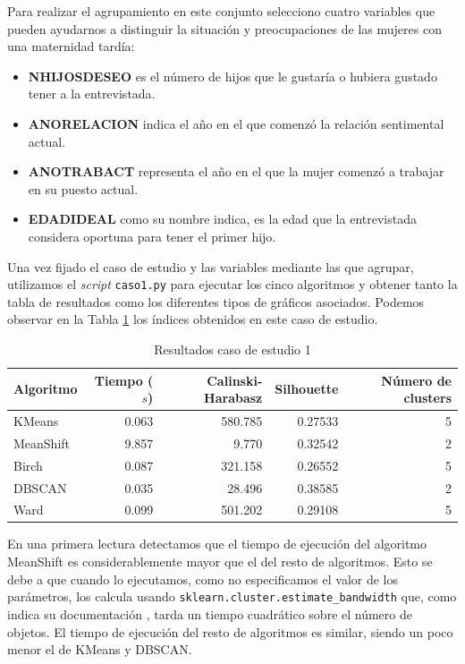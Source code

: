 \documentclass[a4paper, 20pt]{article}
\begin{document}
Para realizar el agrupamiento en este conjunto selecciono cuatro variables que pueden ayudarnos a distinguir la situación y preocupaciones de las mujeres con una maternidad tardía:
\begin{itemize}
\item \textbf{NHIJOSDESEO} es el número de hijos que le gustaría o hubiera gustado tener a la entrevistada.
\item \textbf{ANORELACION} indica el año en el que comenzó la relación sentimental actual.
\item \textbf{ANOTRABACT} representa el año en el que la mujer comenzó a trabajar en su puesto actual.
\item \textbf{EDADIDEAL} como su nombre indica, es la edad que la entrevistada considera oportuna para tener el primer hijo.
\end{itemize}

Una vez fijado el caso de estudio y las variables mediante las que agrupar, utilizamos el \textit{script} \texttt{caso1.py} para ejecutar los cinco algoritmos y obtener tanto la tabla de resultados como los diferentes tipos de gráficos asociados. Podemos observar en la Tabla \ref{tab:algorithms1} los índices obtenidos en este caso de estudio.

\begin{table}[H]
\centering
\caption{Resultados caso de estudio 1}
\label{tab:algorithms1}
\begin{tabular}{lrrrr}
\toprule
Algoritmo & Tiempo ($s$) & Calinski-Harabasz & Silhouette & Número de clusters\\
\midrule
KMeans & 0.063 & 580.785 & 0.27533 & 5 \\
MeanShift & 9.857 & 9.770 & 0.32542 & 2 \\
Birch & 0.087 & 321.158 & 0.26552 & 5 \\
DBSCAN & 0.035 & 28.496 & 0.38585 & 2 \\
Ward & 0.099 & 501.202 & 0.29108 & 5 \\
\bottomrule
\end{tabular}
\end{table}

En una primera lectura detectamos que el tiempo de ejecución del algoritmo MeanShift es considerablemente mayor que el del resto de algoritmos. Esto se debe a que cuando lo ejecutamos, como no especificamos el valor de los parámetros, los calcula usando \texttt{sklearn.cluster.estimate\_bandwidth} que, como indica su documentación \cite{bandwidth}, tarda un tiempo cuadrático sobre el número de objetos. El tiempo de ejecución del resto de algoritmos es similar, siendo un poco menor el de KMeans y DBSCAN.
\end{document}
